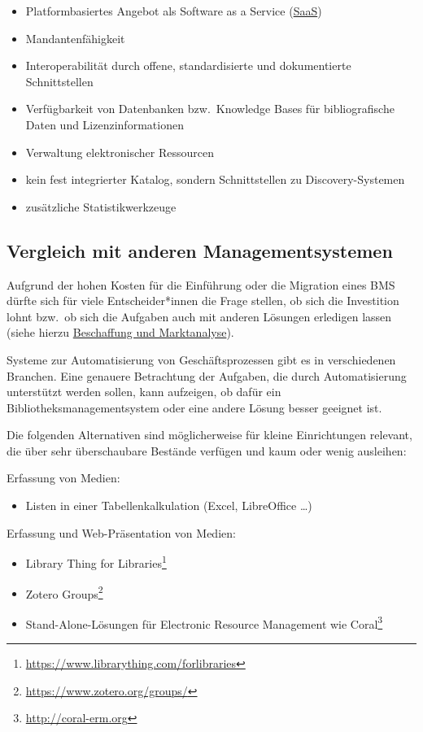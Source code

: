 \documentclass[
  11pt,
  letterpaper,
  DIV=11,
  twoside]{scrreprt}
\providecommand{\tightlist}{%
  \setlength{\itemsep}{0pt}\setlength{\parskip}{0pt}}\usepackage{longtable,booktabs,array}
\DeclareRobustCommand{\href}[2]{#2\footnote{\url{#1}}}
\begin{document}
\begin{itemize}
\item
  Platformbasiertes Angebot als Software as a Service
  (\hyperref[cloud]{SaaS})
\item
  Mandantenfähigkeit
\item
  Interoperabilität durch offene, standardisierte und dokumentierte
  Schnittstellen
\item
  Verfügbarkeit von Datenbanken bzw.~Knowledge Bases für bibliografische
  Daten und Lizenzinformationen
\item
  Verwaltung elektronischer Ressourcen
\item
  kein fest integrierter Katalog, sondern Schnittstellen zu
  Discovery-Systemen
\item
  zusätzliche Statistikwerkzeuge
\end{itemize}

\subsection{Vergleich mit anderen
Managementsystemen}\label{vergleich-mit-anderen-managementsystemen}

Aufgrund der hohen Kosten für die Einführung oder die Migration eines
BMS dürfte sich für viele Entscheider*innen die Frage stellen, ob sich
die Investition lohnt bzw.~ob sich die Aufgaben auch mit anderen
Lösungen erledigen lassen (siehe hierzu
\hyperref[beschaffung-und-marktanalyse]{Beschaffung und Marktanalyse}).

Systeme zur Automatisierung von Geschäftsprozessen gibt es in
verschiedenen Branchen. Eine genauere Betrachtung der Aufgaben, die
durch Automatisierung unterstützt werden sollen, kann aufzeigen, ob
dafür ein Bibliotheksmanagementsystem oder eine andere Lösung besser
geeignet ist.

Die folgenden Alternativen sind möglicherweise für kleine Einrichtungen
relevant, die über sehr überschaubare Bestände verfügen und kaum oder
wenig ausleihen:

Erfassung von Medien:

\begin{itemize}
\tightlist
\item
  Listen in einer Tabellenkalkulation (Excel, LibreOffice \ldots)
\end{itemize}

Erfassung und Web-Präsentation von Medien:

\begin{itemize}
\item
  \href{https://www.librarything.com/forlibraries}{Library Thing for
  Libraries}
\item
  \href{https://www.zotero.org/groups/}{Zotero Groups}
\item
  Stand-Alone-Lösungen für Electronic Resource Management wie
  \href{http://coral-erm.org}{Coral}
\end{itemize}
\end{document}
